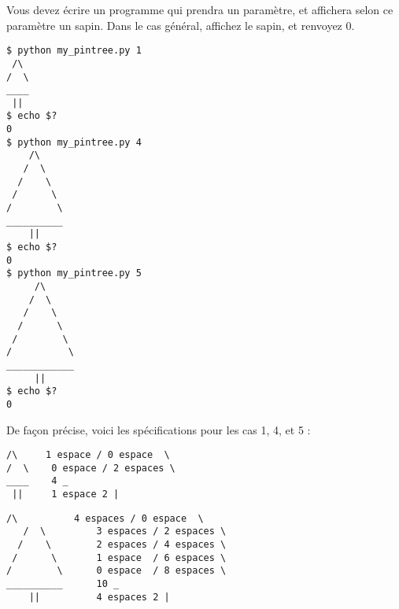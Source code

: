 

\vspace*{0.7cm}

\noindent {}

\bigskip

\noindent Vous devez écrire un programme qui prendra un paramètre, et affichera selon ce paramètre un sapin.
\noindent Dans le cas général, affichez le sapin, et renvoyez 0.

\bigskip

\lstset{language=sh}
\begin{lstlisting}[frame=single,title={Cas général}]
$ python my_pintree.py 1
 /\
/  \
____
 ||
$ echo $?
0
$ python my_pintree.py 4
    /\
   /  \
  /    \
 /      \
/        \
__________
    ||
$ echo $?
0
$ python my_pintree.py 5
     /\
    /  \
   /    \
  /      \
 /        \
/          \
____________
     ||
$ echo $?
0
\end{lstlisting}

\newpage

\noindent De façon précise, voici les spécifications pour les cas 1, 4, et 5 :

\bigskip

\hspace*{-\parindent} %
\begin{minipage}{15.85cm} %
\lstset{language=sh}
\begin{lstlisting}[frame=single,title={Cas général 1}]
 /\     1 espace / 0 espace  \
/  \    0 espace / 2 espaces \
____    4 _
 ||     1 espace 2 |
\end{lstlisting}
\end{minipage} %

\hspace*{-\parindent} %
\begin{minipage}{15.85cm} %
\lstset{language=sh}
\begin{lstlisting}[frame=single,title={Cas général 4}]
    /\          4 espaces / 0 espace  \
   /  \         3 espaces / 2 espaces \
  /    \        2 espaces / 4 espaces \
 /      \       1 espace  / 6 espaces \
/        \      0 espace  / 8 espaces \
__________      10 _
    ||          4 espaces 2 |
\end{lstlisting}
\end{minipage} %

